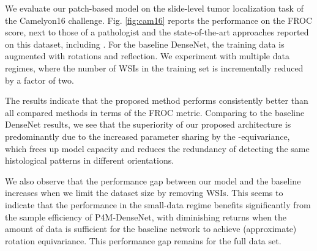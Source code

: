 \documentclass{llncs}
\begin{document}
We evaluate our patch-based model on the slide-level tumor localization task of the Camelyon16 challenge. Fig. \ref{fig:cam16} reports the performance on the FROC score, next to those of a pathologist \cite{Ehteshami_Bejnordi2017-pt} and the state-of-the-art approaches reported on this dataset, including \cite{Liu2017-jq,Wang2016-yf}. For the baseline DenseNet, the training data is augmented with  rotations and reflection. We experiment with multiple data regimes, where the number of WSIs in the training set is incrementally reduced by a factor of two. 

The results indicate that the proposed method performs consistently better than all compared methods in terms of the FROC metric. Comparing to the baseline DenseNet results, we see that the superiority of our proposed architecture is predominantly due to the increased parameter sharing by the -equivariance, which frees up model capacity and reduces the redundancy of detecting the same histological patterns in different orientations.

We also observe that the performance gap between our model and the baseline increases when we limit the dataset size by removing WSIs. This seems to indicate that the performance in the small-data regime benefits significantly from the sample efficiency of P4M-DenseNet, with diminishing returns when the amount of data is sufficient for the baseline network to achieve (approximate) rotation equivariance. This performance gap remains for the full data set.
\end{document}
